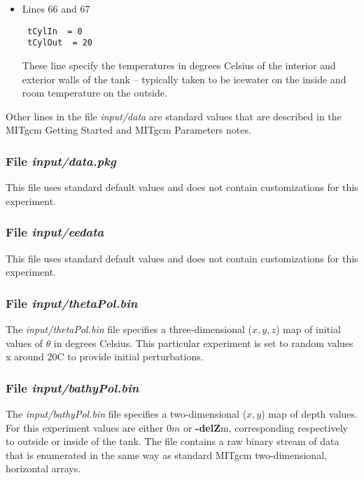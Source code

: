 \begin{itemize}
\item Lines 66 and 67
\begin{verbatim}
 tCylIn  = 0
 tCylOut  = 20
\end{verbatim}
These line specify the temperatures in degrees Celsius of the interior
and exterior walls of the tank -- typically taken to be icewater on
the inside and room temperature on the outside.


\end{itemize}

\noindent Other lines in the file {\it input/data} are standard values
that are described in the MITgcm Getting Started and MITgcm Parameters
notes.

\begin{small}

\end{small}

\subsubsection{File {\it input/data.pkg}}
\label{www:tutorials}

This file uses standard default values and does not contain
customizations for this experiment.

\subsubsection{File {\it input/eedata}}
\label{www:tutorials}

This file uses standard default values and does not contain
customizations for this experiment.

\subsubsection{File {\it input/thetaPol.bin}}
\label{www:tutorials}

The {\it input/thetaPol.bin} file specifies a three-dimensional ($x,y,z$) 
map of initial values of $\theta$ in degrees Celsius.  This particular 
experiment is set to random values x around 20C to provide initial 
perturbations.

\subsubsection{File {\it input/bathyPol.bin}}
\label{www:tutorials}


The {\it input/bathyPol.bin} file specifies a two-dimensional ($x,y$) 
map of depth values. For this experiment values are either
$0m$ or {\bf -delZ}m, corresponding respectively to outside or inside of
the tank. The file contains a raw binary stream of data that is enumerated
in the same way as standard MITgcm two-dimensional, horizontal arrays.

